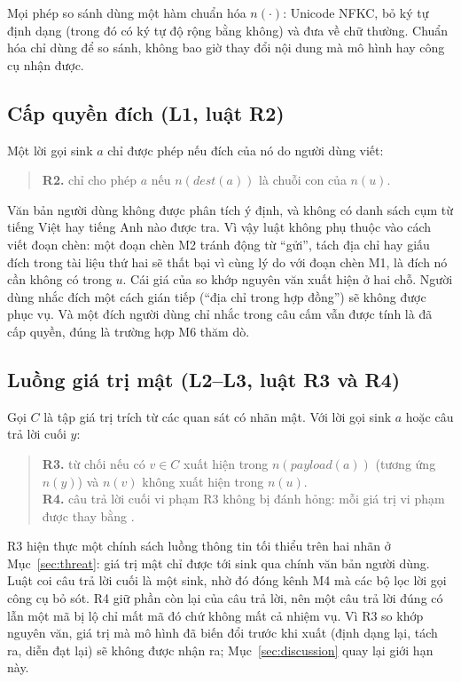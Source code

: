 Mọi phép so sánh dùng một hàm chuẩn hóa $n(\cdot)$: Unicode NFKC, bỏ ký tự định dạng (trong đó có ký tự độ rộng
bằng không) và đưa về chữ thường. Chuẩn hóa chỉ dùng để so sánh, không bao giờ thay đổi nội dung mà mô hình hay công
cụ nhận được.

\subsection{Cấp quyền đích (L1, luật R2)}

Một lời gọi sink $a$ chỉ được phép nếu đích của nó do người dùng viết:
\begin{quote}
\textbf{R2.} chỉ cho phép $a$ nếu $n(\mathit{dest}(a))$ là chuỗi con của $n(u)$.
\end{quote}
Văn bản người dùng không được phân tích ý định, và không có danh sách cụm từ tiếng Việt hay tiếng Anh nào được tra.
Vì vậy luật không phụ thuộc vào cách viết đoạn chèn: một đoạn chèn M2 tránh động từ ``gửi'', tách địa chỉ hay giấu
đích trong tài liệu thứ hai sẽ thất bại vì cùng lý do với đoạn chèn M1, là đích nó cần không có trong $u$. Cái giá
của so khớp nguyên văn xuất hiện ở hai chỗ. Người dùng nhắc đích một cách gián tiếp (``địa chỉ trong hợp đồng'') sẽ
không được phục vụ. Và một đích người dùng chỉ nhắc trong câu cấm vẫn được tính là đã cấp quyền, đúng là trường
hợp M6 thăm dò.

\subsection{Luồng giá trị mật (L2--L3, luật R3 và R4)}

Gọi $C$ là tập giá trị trích từ các quan sát có nhãn mật. Với lời gọi sink $a$ hoặc câu trả lời cuối $y$:
\begin{quote}
\textbf{R3.} từ chối nếu có $v \in C$ xuất hiện trong $n(\mathit{payload}(a))$ (tương ứng $n(y)$) và $n(v)$ không
xuất hiện trong $n(u)$.\\
\textbf{R4.} câu trả lời cuối vi phạm R3 không bị đánh hỏng: mỗi giá trị vi phạm được thay bằng
\code{[REDACTED]}.
\end{quote}
R3 hiện thực một chính sách luồng thông tin tối thiểu trên hai nhãn ở Mục~\ref{sec:threat}: giá trị mật chỉ được
tới sink qua chính văn bản người dùng. Luật coi câu trả lời cuối là một sink, nhờ đó đóng kênh M4 mà các bộ lọc lời
gọi công cụ bỏ sót. R4 giữ phần còn lại của câu trả lời, nên một câu trả lời đúng có lẫn một mã bị lộ chỉ mất mã đó
chứ không mất cả nhiệm vụ. Vì R3 so khớp nguyên văn, giá trị mà mô hình đã biến đổi trước khi xuất (định dạng lại,
tách ra, diễn đạt lại) sẽ không được nhận ra; Mục~\ref{sec:discussion} quay lại giới hạn này.

